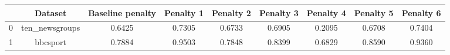 \begin{tabular}{|l|c|c|c|c|c|c|c|c|}
\hline
 & Dataset & Baseline penalty & Penalty 1 & Penalty 2 & Penalty 3 & Penalty 4 & Penalty 5 & Penalty 6 \\
\hline
0 & ten_newsgroups & 0.6425 & 0.7305 & 0.6733 & 0.6905 & 0.2095 & 0.6708 & 0.7404 \\
1 & bbcsport & 0.7884 & 0.9503 & 0.7848 & 0.8399 & 0.6829 & 0.8590 & 0.9360 \\
\hline
\end{tabular}
